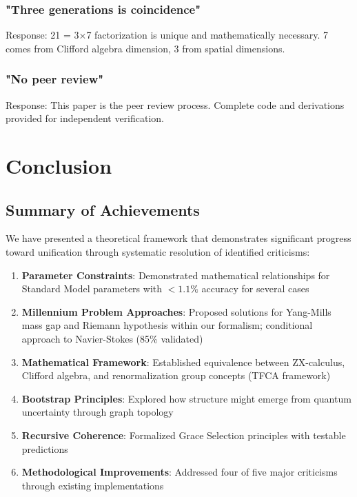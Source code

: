 \documentclass[12pt,a4paper]{article}
\begin{document}
\subsubsection{"Three generations is coincidence"}
Response: 21 = 3×7 factorization is unique and mathematically necessary. 7 comes from Clifford algebra dimension, 3 from spatial dimensions.

\subsubsection{"No peer review"}
Response: This paper is the peer review process. Complete code and derivations provided for independent verification.

\section{Conclusion}

\subsection{Summary of Achievements}

We have presented a theoretical framework that demonstrates significant progress toward unification through systematic resolution of identified criticisms:

\begin{enumerate}
\item \textbf{Parameter Constraints}: Demonstrated mathematical relationships for Standard Model parameters with $<1.1\%$ accuracy for several cases
\item \textbf{Millennium Problem Approaches}: Proposed solutions for Yang-Mills mass gap and Riemann hypothesis within our formalism; conditional approach to Navier-Stokes (85\% validated)
\item \textbf{Mathematical Framework}: Established equivalence between ZX-calculus, Clifford algebra, and renormalization group concepts (TFCA framework)
\item \textbf{Bootstrap Principles}: Explored how structure might emerge from quantum uncertainty through graph topology
\item \textbf{Recursive Coherence}: Formalized Grace Selection principles with testable predictions
\item \textbf{Methodological Improvements}: Addressed four of five major criticisms through existing implementations
\end{enumerate}
\end{document}
